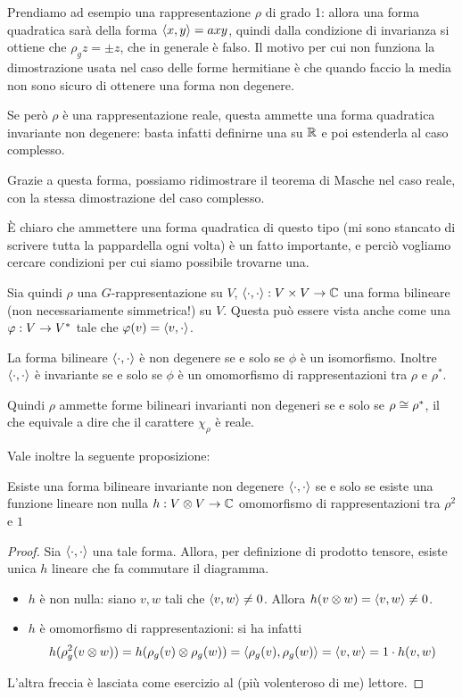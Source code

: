 	Prendiamo ad esempio una rappresentazione $\rho$ di grado 1: allora una forma quadratica sarà della forma $\langle x , y\rangle = axy$, quindi dalla condizione di invarianza si ottiene che $\rho_g z = \pm z$, che in generale è falso. Il motivo per cui non funziona la dimostrazione usata nel caso delle forme hermitiane è che quando faccio la media non sono sicuro di ottenere una forma non degenere.
	
	Se però $\rho$ è una rappresentazione reale, questa ammette una forma quadratica invariante non degenere: basta infatti definirne una su $\mathbb R$ e poi estenderla al caso complesso. %
	
	Grazie a questa forma, possiamo ridimostrare il teorema di Masche nel caso reale, con la stessa dimostrazione del caso complesso.
	
	È chiaro che ammettere una forma quadratica di questo tipo (mi sono stancato di scrivere tutta la pappardella ogni volta) è un fatto importante, e perciò vogliamo cercare condizioni per cui siamo possibile trovarne una.
	
	Sia quindi $\rho$ una $G$-rappresentazione su $V$, $\langle\cdot , \cdot\rangle: V \times V \rightarrow \mathbb C$ una forma bilineare (non necessariamente simmetrica!) su $V$. 
	Questa può essere vista anche come una $\varphi: V \rightarrow V^*$ tale che $\varphi(v) = \langle v , \cdot\rangle$. 
	
	\begin{myprop}
		La forma bilineare $\langle\cdot , \cdot\rangle$ è non degenere se e solo se $\phi$ è un isomorfismo. Inoltre $\langle\cdot , \cdot\rangle $ è invariante se e solo se $\phi$ è un omomorfismo di rappresentazioni tra $\rho$ e $\rho^*$.
	\end{myprop}
	
	Quindi $\rho$ ammette forme bilineari invarianti non degeneri se e solo se $\rho \cong \rho^*$, il che equivale a dire che il carattere $\chi_\rho$ è reale.
	
	Vale inoltre la seguente proposizione:
	
	\begin{myprop}
		Esiste una forma bilineare invariante non degenere $\langle\cdot , \cdot\rangle $ se e solo se esiste una funzione lineare non nulla $h: V \otimes V \rightarrow \mathbb C$ omomorfismo di rappresentazioni tra $\rho^2$ e $1$
	\end{myprop}
	
	\begin{proof}
		Sia $\langle\cdot , \cdot\rangle $ una tale forma. Allora, per definizione di prodotto tensore, esiste unica $h$ lineare che fa commutare il diagramma.
		\begin{itemize}
		 \item $h$ è non nulla: siano $v,w$ tali che $\langle v , w\rangle\neq 0$. Allora $h(v \otimes w )=\langle v , w\rangle \neq 0$.
		 \item $h$ è omomorfismo di rappresentazioni: si ha infatti 
		 \[
			h(\rho_g^2(v \otimes w))=h(\rho_g(v) \otimes \rho_g(w))=\langle\rho_g(v) , \rho_g(w)\rangle=\langle v , w\rangle=1\cdot h(v,w)
		 \]
		\end{itemize}
		
		L'altra freccia è lasciata come esercizio al (più volenteroso di me) lettore.
	\end{proof}


